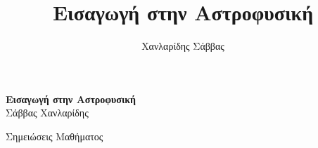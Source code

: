 \newcommand{\dbar}{{d\mkern-7mu\mathchar'26\mkern-2mu}} %

\title{Εισαγωγή στην Αστροφυσική}
\author{Χανλαρίδης Σάββας}


    \renewcommand{\contentsname}{Περιεχόμενα}
    \renewcommand{\listfigurename}{Λίστα Σχημάτων}
    \renewcommand{\listtablename}{Λίστα Πινάκων}
    \renewcommand{\chaptername}{Κεφάλαιο}
    \renewcommand{\appendixname}{Παράρτημα}
    \renewcommand{\bibname}{Βιβλιογραφία}
    
    \frontmatter  %
    


    
    \begin{titlepage}
        \begingroup
        \thispagestyle{empty}
        \centering
        \vspace*{5cm}
        \par\normalfont\fontsize{35}{35}\sffamily\selectfont
        \textbf{Εισαγωγή στην Αστροφυσική}\\
        {\LARGE Σάββας Χανλαρίδης}\par %
        \vspace*{1cm}
        {\Huge Σημειώσεις Μαθήματος}\par %
        \endgroup
    \end{titlepage}

